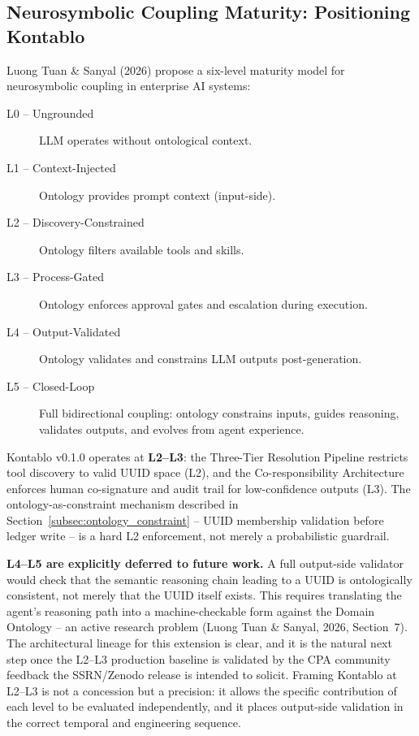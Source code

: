 \subsection{Neurosymbolic Coupling Maturity: Positioning Kontablo}
\label{subsec:coupling_maturity}

Luong Tuan \& Sanyal (2026) propose a six-level maturity model for
neurosymbolic coupling in enterprise AI systems:

\begin{description}
  \item[L0 -- Ungrounded] LLM operates without ontological context.
  \item[L1 -- Context-Injected] Ontology provides prompt context (input-side).
  \item[L2 -- Discovery-Constrained] Ontology filters available tools and skills.
  \item[L3 -- Process-Gated] Ontology enforces approval gates and escalation during execution.
  \item[L4 -- Output-Validated] Ontology validates and constrains LLM outputs post-generation.
  \item[L5 -- Closed-Loop] Full bidirectional coupling: ontology constrains inputs, guides reasoning, validates outputs, and evolves from agent experience.
\end{description}

Kontablo v0.1.0 operates at \textbf{L2--L3}: the Three-Tier Resolution
Pipeline restricts tool discovery to valid UUID space (L2), and the
Co-responsibility Architecture enforces human co-signature and audit trail
for low-confidence outputs (L3). The ontology-as-constraint mechanism
described in Section~\ref{subsec:ontology_constraint} -- UUID membership
validation before ledger write -- is a hard L2 enforcement, not merely a
probabilistic guardrail.

\textbf{L4--L5 are explicitly deferred to future work.} A full output-side
validator would check that the semantic reasoning chain leading to a UUID is
ontologically consistent, not merely that the UUID itself exists. This
requires translating the agent's reasoning path into a machine-checkable form
against the Domain Ontology -- an active research problem (Luong Tuan \&
Sanyal, 2026, Section~7). The architectural lineage for this extension is
clear, and it is the natural next step once the L2--L3 production baseline is
validated by the CPA community feedback the SSRN/Zenodo release is intended
to solicit. Framing Kontablo at L2--L3 is not a concession but a precision:
it allows the specific contribution of each level to be evaluated
independently, and it places output-side validation in the correct temporal
and engineering sequence.
